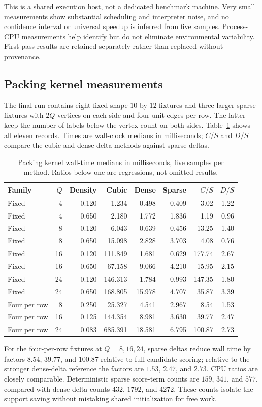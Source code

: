 \documentclass[11pt,letterpaper]{article}
\theoremstyle{remark}\newtheorem{remark}[theorem]{Remark}
\begin{document}
This is a shared execution host, not a dedicated benchmark machine. Very small measurements show substantial scheduling and interpreter noise, and no confidence interval or universal speedup is inferred from five samples. Process-CPU measurements help identify but do not eliminate environmental variability. First-pass results are retained separately rather than replaced without provenance.

\subsection{Packing kernel measurements}
The final run contains eight fixed-shape $10$-by-$12$ fixtures and three
larger sparse fixtures with $2Q$ vertices on each side and four unit edges per
row. The latter keep the number of labels below the vertex count on both sides.
Table~\ref{tab:packing-times} shows all eleven records. Times are wall-clock
medians in milliseconds; $C/S$ and $D/S$ compare the cubic and dense-delta
methods against sparse deltas.
\begin{table}[H]\centering\small
\begin{tabular}{@{}lrrrrrrr@{}}\toprule
Family & $Q$ & Density & Cubic & Dense & Sparse & $C/S$ & $D/S$\\\midrule
Fixed & 4 & 0.120 & 1.234 & 0.498 & 0.409 & 3.02 & 1.22 \\
Fixed & 4 & 0.650 & 2.180 & 1.772 & 1.836 & 1.19 & 0.96 \\
Fixed & 8 & 0.120 & 6.043 & 0.639 & 0.456 & 13.25 & 1.40 \\
Fixed & 8 & 0.650 & 15.098 & 2.828 & 3.703 & 4.08 & 0.76 \\
Fixed & 16 & 0.120 & 111.849 & 1.681 & 0.629 & 177.74 & 2.67 \\
Fixed & 16 & 0.650 & 67.158 & 9.066 & 4.210 & 15.95 & 2.15 \\
Fixed & 24 & 0.120 & 146.313 & 1.784 & 0.993 & 147.35 & 1.80 \\
Fixed & 24 & 0.650 & 168.805 & 15.978 & 4.707 & 35.87 & 3.39 \\
Four per row & 8 & 0.250 & 25.327 & 4.541 & 2.967 & 8.54 & 1.53 \\
Four per row & 16 & 0.125 & 144.354 & 8.981 & 3.630 & 39.77 & 2.47 \\
Four per row & 24 & 0.083 & 685.391 & 18.581 & 6.795 & 100.87 & 2.73 \\
\bottomrule\end{tabular}
\caption{Packing kernel wall-time medians in milliseconds, five samples per
method. Ratios below one are regressions, not omitted results.}\label{tab:packing-times}
\end{table}
For the four-per-row fixtures at $Q=8,16,24$, sparse deltas reduce wall time
by factors $8.54$, $39.77$, and $100.87$ relative to full candidate scoring;
relative to the stronger dense-delta reference the factors are $1.53$,
$2.47$, and $2.73$. CPU ratios are closely comparable. Deterministic sparse
score-term counts are $159$, $341$, and $577$, compared with dense-delta
counts $432$, $1792$, and $4272$. These counts isolate the support saving
without mistaking shared initialization for free work.
\end{document}
